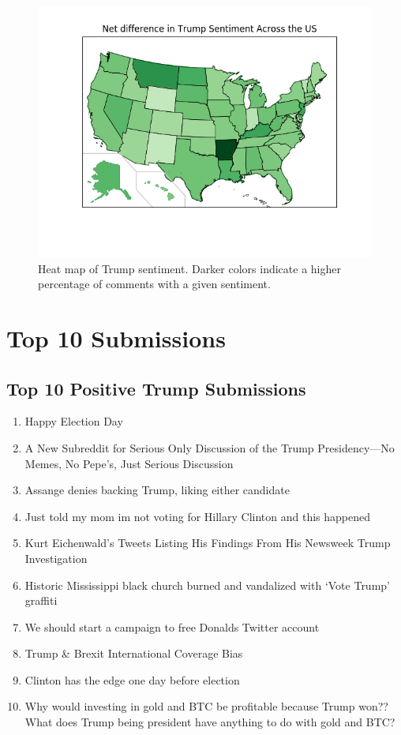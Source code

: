 \documentclass[12pt]{article}
\begin{document}
\begin{figure}[H]
\begin{center}
                          \includegraphics[width=\linewidth,trim={2cm 2cm 1.65cm 0},clip]{plot3_difference_by_state.png}
                \endminipage
        \end{center}
        \caption{Heat map of Trump sentiment. Darker colors indicate a higher percentage of comments with a given sentiment.}
\end{figure}

\section{Top 10 Submissions}

\subsection{Top 10 Positive Trump Submissions}

{\scriptsize
\begin{enumerate}
        \item Happy Election Day
        \item A New Subreddit for Serious Only Discussion of the Trump Presidency---No Memes, No Pepe's, Just Serious Discussion
        \item Assange denies backing Trump, liking either candidate
        \item Just told my mom im not voting for Hillary Clinton and this happened
        \item Kurt Eichenwald's Tweets Listing His Findings From His Newsweek Trump Investigation
        \item Historic Mississippi black church burned and vandalized with `Vote Trump' graffiti
        \item We should start a campaign to free Donalds Twitter account
        \item Trump \& Brexit International Coverage Bias
        \item Clinton has the edge one day before election
        \item Why would investing in gold and BTC be profitable because Trump won?? What does Trump being president have anything to do with gold and BTC?
\end{enumerate}
}
\end{document}
